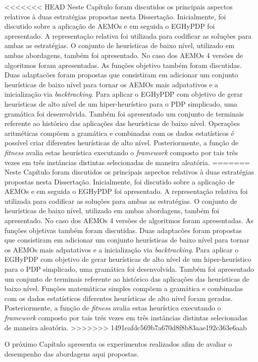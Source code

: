 <<<<<<< HEAD
Neste Capítulo foram discutidos os principais aspectos relativos à duas estratégias propostas nesta Dissertação. Inicialmente, foi discutido sobre a aplicação de AEMOs e em seguida o EGHyPDP foi apresentado. A representação relativa foi utilizada para codificar as soluções para ambas as estratégias. O conjunto de heurísticas de baixo nível, utilizado em ambas abordagens, também foi apresentado. No caso dos AEMOs 4 versões de algoritmos foram apresentadas. As funções objetivo também foram discutidas. Duas adaptacões foram propostas que consistiram em adicionar um conjunto heurísticas de baixo nível para tornar os AEMOs mais adpatativos e a inicialização via \textit{backtracking}. Para aplicar o EGHyPDP com objetivo de gerar heurísticas de alto nível de um  hiper-heurístico para o PDP simplicado, uma  gramática foi desenvolvida. Também foi apresentado um conjunto de terminais referente ao histórico das aplicações das heurísticas de baixo nível. Operações aritméticas compõem a gramática e combinadas com os dados estatísticos é possível criar diferentes heurísticas de alto nível. Posteriormente, a função de \textit{fitness} avalia estas heurística executando o \textit{framework} composto por tais três vezes em três instâncias distintas selecionadas de maneira aleatória.
=======
Neste Capítulo foram discutidos os principais aspectos relativos à duas estratégias propostas nesta Dissertação. Inicialmente, foi discutido sobre a aplicação de AEMOs e em seguida o EGHyPDP foi apresentado. A representação relativa foi utilizada para codificar as soluções para ambas as estratégias. O conjunto de heurísticas de baixo nível, utilizado em ambas abordagens, também foi apresentado. No caso dos AEMOs 4 versões de algoritmos foram apresentadas. As funções objetivas também foram discutidas. Duas adaptacões foram propostas que consistiram em adicionar um conjunto heurísticas de baixo nível para tornar os AEMOs mais adpatativos e a inicialização via \textit{backtracking}. Para aplicar o EGHyPDP com objetivo de gerar heurísticas de alto nível de um  hiper-heurístico para o PDP simplicado, uma  gramática foi desenvolvida. Também foi apresentado um conjunto de terminais referente ao histórico das aplicações das heurísticas de baixo nível. Funções matemáticas simples compõem a gramática e combinadas com os dados estatísticos diferentes heurísticas de alto nível foram geradas. Posteriormente, a função de \textit{fitness} avalia estas heurística executando o \textit{framework} composto por tais trés vezes em três instâncias distintas selecionadas de maneira aleatória.
>>>>>>> 1491eafdc569b7a670d8f8b83aae192c363e6aab
 
 O próximo Capítulo apresenta os experimentos realizados afim de avaliar o desempenho das abordagens aqui propostas.



